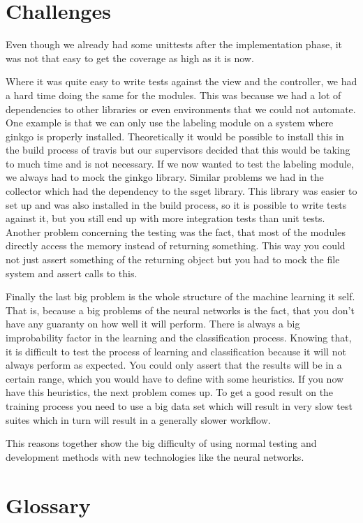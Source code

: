 \documentclass[parskip=full]{scrartcl}
\begin{document}
\newpage

\section{Challenges}

Even though we already had some \glspl{unittest} after the implementation phase, it was not that easy to get the coverage as high as it is now.


Where it was quite easy to write tests against the view and the controller, we had a hard time doing the same for the modules.
This was because we had a lot of dependencies to other libraries or even environments that we could not automate.
One example is that we can only use the labeling module on a system where \gls{ginkgo} is properly installed.
Theoretically it would be possible to install this in the build process of \gls{travis} but our supervisors decided that this would be taking to much time and is not necessary.
If we now wanted to test the labeling module, we always had to mock the \gls{ginkgo} library.
Similar problems we had in the collector which had the dependency to the \gls{ssget} library.
This library was easier to set up and was also installed in the build process, so it is possible to write tests against it, but you still end up with more integration tests than unit tests.
Another problem concerning the testing was the fact, that most of the modules directly access the memory instead of returning something.
This way you could not just assert something of the returning object but you had to mock the file system and assert calls to this.


Finally the last big problem is the whole structure of the machine learning it self.
That is, because a big problems of the neural networks is the fact, that you don't have any guaranty on how well it will perform.
There is always a big improbability factor in the learning and the classification process.
Knowing that, it is difficult to test the process of learning and classification because it will not always perform as expected.
You could only assert that the results will be in a certain range, which you would have to define with some heuristics.
If you now have this heuristics, the next problem comes up.
To get a good result on the training process you need to use a big data set which will result in very slow test suites which in turn will result in a generally slower workflow.


This reasons together show the big difficulty of using normal testing and development methods with new technologies like the neural networks.

\newpage

\section{Glossary}

%
\printnoidxglossaries
\end{document}
